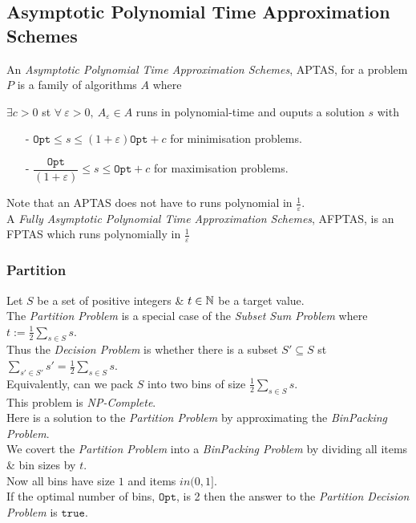 \documentclass[11pt,a4paper]{article}
\begin{document}
\subsection{Asymptotic Polynomial Time Approximation Schemes}

An \textit{Asymptotic Polynomial Time Approximation Schemes}, APTAS, for a problem $P$ is a family of algorithms $A$ where
\begin{center}
$\exists c>0$ st $\forall\ \varepsilon>0,\ A_\varepsilon\in A$ runs in polynomial-time and ouputs a solution $s$ with
\begin{itemize}
	\item[-] $\mathtt{Opt}\leq s\leq(1+\varepsilon)\mathtt{Opt}+c$ for minimisation problems.
	\item[-] $\dfrac{\mathtt{Opt}}{(1+\varepsilon)}\leq s\leq\mathtt{Opt}+c$ for maximisation problems.
\end{itemize}
\end{center}
Note that an APTAS does not have to runs polynomial in $\frac1\varepsilon$.\\

A \textit{Fully Asymptotic Polynomial Time Approximation Schemes}, AFPTAS, is an FPTAS which runs polynomially in $\frac{1}\varepsilon$

\subsubsection{Partition}

Let $S$ be a set of positive integers \& $t\in\mathbb{N}$ be a target value.\\
The \textit{Partition Problem} is a special case of the \textit{Subset Sum Problem} where $t:=\frac{1}{2}\sum_{s\in S}s$.\\
Thus the \textit{Decision Problem} is whether there is a subset $S'\subseteq S$ st $\sum_{s'\in S'}s'=\frac{1}{2}\sum_{s\in S}s$.\\
Equivalently, can we pack $S$ into two bins of size $\frac12\sum_{s\in S}s$.\\
\nb This problem is \textit{NP-Complete}.\\

Here is a solution to the \textit{Partition Problem} by approximating the \textit{BinPacking Problem}.\\
We covert the \textit{Partition Problem} into a \textit{BinPacking Problem} by dividing all items \& bin sizes by $t$.\\
Now all bins have size $1$ and items $in(0,1]$.\\
If the optimal number of bins, $\mathtt{Opt}$, is 2 then the answer to the \textit{Partition Decision Problem} is $\mathtt{true}$.\\
\end{document}
